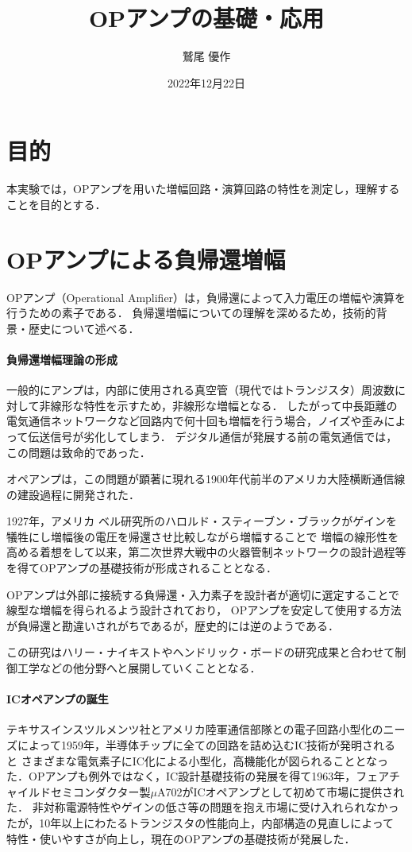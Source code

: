 \documentclass[dvipdfmx,titlepage,a4j]{jsarticle}  %
\title{OPアンプの基礎・応用}
\author{鷲尾 優作}
\date{2022年12月22日}
\begin{document}
\pagestyle{foot}

\maketitle

\section{目的}
本実験では，OPアンプを用いた増幅回路・演算回路の特性を測定し，理解することを目的とする．

\section{OPアンプによる負帰還増幅}
OPアンプ（Operational Amplifier）は，負帰還によって入力電圧の増幅や演算を行うための素子である．
負帰還増幅についての理解を深めるため，技術的背景・歴史について述べる．

\paragraph{負帰還増幅理論の形成\\}
一般的にアンプは，内部に使用される真空管（現代ではトランジスタ）周波数に対して非線形な特性を示すため，非線形な増幅となる．
したがって中長距離の電気通信ネットワークなど回路内で何十回も増幅を行う場合，ノイズや歪みによって伝送信号が劣化してしまう．
デジタル通信が発展する前の電気通信では，この問題は致命的であった．

オペアンプは，この問題が顕著に現れる1900年代前半のアメリカ大陸横断通信線の建設過程に開発された．

1927年，アメリカ ベル研究所のハロルド・スティーブン・ブラックがゲインを犠牲にし増幅後の電圧を帰還させ比較しながら増幅することで
増幅の線形性を高める着想をして以来，第二次世界大戦中の火器管制ネットワークの設計過程等を得てOPアンプの基礎技術が形成されることとなる．

OPアンプは外部に接続する負帰還・入力素子を設計者が適切に選定することで線型な増幅を得られるよう設計されており，
OPアンプを安定して使用する方法が負帰還と勘違いされがちであるが，歴史的には逆のようである．

この研究はハリー・ナイキストやヘンドリック・ボードの研究成果と合わせて制御工学などの他分野へと展開していくこととなる．

\paragraph{ICオペアンプの誕生\\}
テキサスインスツルメンツ社とアメリカ陸軍通信部隊との電子回路小型化のニーズによって1959年，半導体チップに全ての回路を詰め込むIC技術が発明されると
さまざまな電気素子にIC化による小型化，高機能化が図られることとなった．OPアンプも例外ではなく，IC設計基礎技術の発展を得て1963年，フェアチャイルドセミコンダクター製$\mu$A702がICオペアンプとして初めて市場に提供された．
非対称電源特性やゲインの低さ等の問題を抱え市場に受け入れられなかったが，10年以上にわたるトランジスタの性能向上，内部構造の見直しによって
特性・使いやすさが向上し，現在のOPアンプの基礎技術が発展した．
\end{document}
